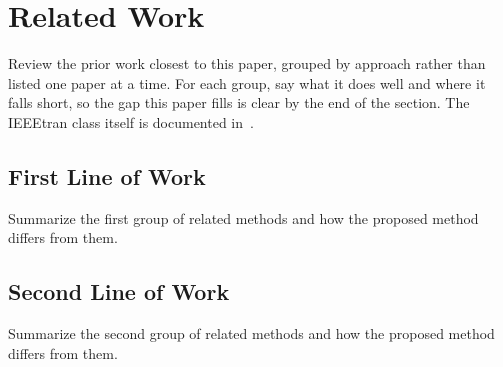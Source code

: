 \section{Related Work}
\label{sec:related}

Review the prior work closest to this paper, grouped by approach rather than listed one paper at a time. For each group, say what it does well and where it falls short, so the gap this paper fills is clear by the end of the section. The IEEEtran class itself is documented in~\cite{shell2015ieeetran}.

\subsection{First Line of Work}
Summarize the first group of related methods and how the proposed method differs from them.

\subsection{Second Line of Work}
Summarize the second group of related methods and how the proposed method differs from them.
